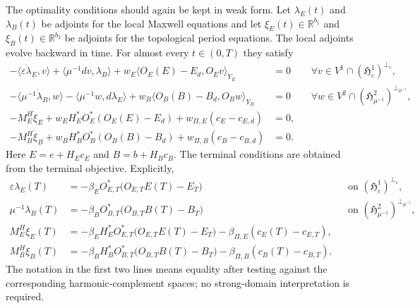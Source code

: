 \documentclass{article}
\newcommand{\R} {\mathbb R}
\newcommand{\HH}{\mathfrak H}
\newcommand{\ip}[2]{\langle #1,#2\rangle}
\begin{document}
The optimality conditions should again be kept in weak form.  Let $\lambda_E(t)$ and $\lambda_B(t)$ be adjoints for the local Maxwell equations and let $\xi_E(t)\in\R^{b_1}$ and $\xi_B(t)\in\R^{b_2}$ be adjoints for the topological period equations.  The local adjoints evolve backward in time.  For almost every $t\in(0,T)$ they satisfy
\begin{subequations}
\label{eq:maxwell-adjoint}
\begin{align}
  -\ip{\varepsilon\dot\lambda_E}{v}
  +\ip{\mu^{-1}dv}{\lambda_B}
  +w_E\ip{O_E(E)-E_d}{O_Ev}_{Y_E}
  &=0
  &&\forall v\in V^1\cap(\HH^1_{\varepsilon})^{\perp_\varepsilon},
  \\
  -\ip{\mu^{-1}\dot\lambda_B}{w}
  -\ip{\mu^{-1}w}{d\lambda_E}
  +w_B\ip{O_B(B)-B_d}{O_Bw}_{Y_B}
  &=0
  &&\forall w\in V^2\cap(\HH^2_{\mu^{-1}})^{\perp_{\mu^{-1}}},
  \\
  -M_E^H\dot\xi_E
  +w_E H_E^*O_E^*(O_E(E)-E_d)
  +w_{\Pi,E}(c_E-c_{E,d})
  &=0,
  \\
  -M_B^H\dot\xi_B
  +w_B H_B^*O_B^*(O_B(B)-B_d)
  +w_{\Pi,B}(c_B-c_{B,d})
  &=0.
\end{align}
\end{subequations}
Here $E=e+H_Ec_E$ and $B=b+H_Bc_B$.  The terminal conditions are obtained from the terminal objective.  Explicitly,
\begin{subequations}
\begin{align}
  \varepsilon\lambda_E(T)
  &=-\beta_E O_{E,T}^*\big(O_{E,T}E(T)-E_T\big)
  &&\text{on }(\HH^1_{\varepsilon})^{\perp_\varepsilon},\\
  \mu^{-1}\lambda_B(T)
  &=-\beta_B O_{B,T}^*\big(O_{B,T}B(T)-B_T\big)
  &&\text{on }(\HH^2_{\mu^{-1}})^{\perp_{\mu^{-1}}},\\
  M_E^H\xi_E(T)
  &=-\beta_E H_E^*O_{E,T}^*\big(O_{E,T}E(T)-E_T\big)
    -\beta_{\Pi,E}(c_E(T)-c_{E,T}),\\
  M_B^H\xi_B(T)
  &=-\beta_B H_B^*O_{B,T}^*\big(O_{B,T}B(T)-B_T\big)
    -\beta_{\Pi,B}(c_B(T)-c_{B,T}).
\end{align}
\end{subequations}
The notation in the first two lines means equality after testing against the corresponding harmonic-complement spaces; no strong-domain interpretation is required.
\end{document}
